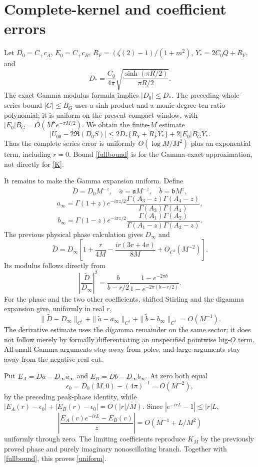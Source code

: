 \documentclass[11pt,a4paper]{article}
\newcommand{\ga}{\mathfrak a}
\newcommand{\gb}{\mathfrak b}
\begin{document}
\newpage
\section{Complete-kernel and coefficient errors}
Let $D_0=C_+c_A$, $E_0=C_+c_B$,
$R_F=(\zeta(2)-1)/(1+m^2)$, $Y_*=2C_0Q+R_Y$, and
\[
 D_*=\frac{C_0}{4\pi}
       \sqrt{\frac{\sinh(\pi R/2)}{\pi R/2}}.
\]
The exact Gamma modulus formula implies $|D_0|\le D_*$.
The preceding whole-series bound $|G|\le B_G$ uses a sinh product
and a monic degree-ten ratio polynomial; it is uniform on the
present compact window, with
$|E_0|B_G=O(M^8e^{-\pi M/2})$.
We obtain the finite-$M$ estimate
\begin{equation}
 |U_{00}-2\Re(D_0S)|
 \le2D_*\{R_Y+R_FY_*\}+2|E_0|B_GY_*.
 \label{fullbound}
\end{equation}
Thus the complete series error is uniformly $O(\log M/M^2)$
plus an exponential term, including $r=0$. Bound \eqref{fullbound}
is for the Gamma-exact approximation, not directly for \eqref{K}.

It remains to make the Gamma expansion uniform. Define
\[
 \widetilde D=D_0M^{-z},\quad
 \widetilde a=\ga M^{-z},\quad \widetilde b=\gb M^{z},
\]
\[
 a_\infty=\Gamma(1+z)e^{-i\pi z/2}
   \frac{\Gamma(A_3-z)\Gamma(A_4-z)}{\Gamma(A_3)\Gamma(A_4)},
\]
\[
 b_\infty=\Gamma(1-z)e^{-i\pi z/2}
   \frac{\Gamma(A_1)\Gamma(A_2)}{\Gamma(A_1-z)\Gamma(A_2-z)}.
\]
The previous physical phase calculation gives $D_\infty$ and
\[
 \widetilde D=D_\infty\left[
 1+\frac{r}{4M}-\frac{ir(3r+4v)}{8M}+O_{C^1}(M^{-2})\right].
\]
Its modulus follows directly from
\[
 \left|\frac{\widetilde D}{D_\infty}\right|^2
 =\frac{b}{b-r/2}
   \frac{1-e^{-2\pi b}}{1-e^{-2\pi(b-r/2)}}.
\]
For the phase and the two other coefficients, shifted Stirling and
the digamma expansion \cite{stirling} give, uniformly in real $r$,
\[
 \|\widetilde D-D_\infty\|_{C^1}
 +\|\widetilde a-a_\infty\|_{C^1}
 +\|\widetilde b-b_\infty\|_{C^1}=O(M^{-1}).
\]
The derivative estimate uses the digamma remainder on the same
sector; it does not follow merely by formally differentiating an
unspecified pointwise big-$O$ term. All small Gamma arguments stay
away from poles, and large arguments stay away from the negative
real cut.

Put $E_A=\widetilde D\widetilde a-D_\infty a_\infty$ and
$E_B=\widetilde D\widetilde b-D_\infty b_\infty$.
At zero both equal
\[
 \epsilon_0=D_0(M,0)-(4\pi)^{-1}=O(M^{-2}),
\]
by the preceding peak-phase identity, while
$|E_A(r)-\epsilon_0|+|E_B(r)-\epsilon_0|=O(|r|/M)$.
Since $|e^{-irL}-1|\le |r|L$,
\[
 \left|\frac{E_A(r)e^{-irL}-E_B(r)}{z}\right|
       =O(M^{-1}+L/M^2)
\]
uniformly through zero. The limiting coefficients reproduce
$K_M$ by the previously proved phase and purely imaginary
nonoscillating branch. Together with \eqref{fullbound}, this proves
\eqref{uniform}.
\end{document}
